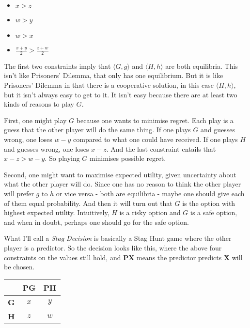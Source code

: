 \documentclass[
  12pt,
]{article}
\providecommand{\tightlist}{%
  \setlength{\itemsep}{0pt}\setlength{\parskip}{0pt}}
\begin{document}
\begin{itemize}
\tightlist
\item
  \(x > z\)
\item
  \(w > y\)
\item
  \(w > x\)
\item
  \(\frac{x + y}{2} > \frac{z + w}{2}\)
\end{itemize}

The first two constraints imply that \(\langle G, g \rangle\) and
\(\langle H, h \rangle\) are both equilibria. This isn't like Prisoners'
Dilemma, that only has one equilibrium. But it is like Prisoners'
Dilemma in that there is a cooperative solution, in this case
\(\langle H, h \rangle\), but it isn't always easy to get to it. It
isn't easy because there are at least two kinds of reasons to play
\(G\).

First, one might play \(G\) because one wants to minimise regret. Each
play is a guess that the other player will do the same thing. If one
plays \(G\) and guesses wrong, one loses \(w - y\) compared to what one
could have received. If one plays \(H\) and guesses wrong, one loses
\(x - z\). And the last constraint entails that \(x - z > w - y\). So
playing \(G\) minimises possible regret.

Second, one might want to maximise expected utility, given uncertainty
about what the other player will do. Since one has no reason to think
the other player will prefer \(g\) to \(h\) or vice versa - both are
equilibria - maybe one should give each of them equal probability. And
then it will turn out that \(G\) is the option with highest expected
utility. Intuitively, \(H\) is a risky option and \(G\) is a safe
option, and when in doubt, perhaps one should go for the safe option.

What I'll call a \emph{Stag Decision} is basically a Stag Hunt game
where the other player is a predictor. So the decision looks like this,
where the above four constraints on the values still hold, and
\textbf{PX} means the predictor predicts \textbf{X} will be chosen.

\begin{table}[H]
\centering
\begin{tabular}[t]{>{}r|cc}

\textbf{ } & \textbf{PG} & \textbf{PH}\\
\midrule
\textbf{G} & $x$ & $y$\\
\textbf{H} & $z$ & $w$\\

\end{tabular}
\end{table}
\end{document}
